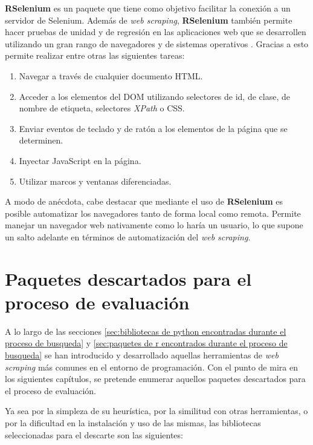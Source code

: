 \textbf{RSelenium} \cite{rselenium-cran} es un paquete que tiene como objetivo facilitar la conexión a un 
servidor de Selenium. Además de \emph{web scraping}, \textbf{RSelenium} también permite hacer pruebas de 
unidad y de regresión en las aplicaciones web que se desarrollen utilizando un gran rango de navegadores 
y de sistemas operativos \cite{tfg-daniel-francisco-lopez}. Gracias a esto permite realizar entre otras 
las siguientes tareas:

\begin{enumerate}
  \item Navegar a través de cualquier documento HTML.
  \item Acceder a los elementos del DOM utilizando selectores de id, de clase, de nombre de etiqueta, 
  selectores \emph{XPath} o CSS.
  \item Enviar eventos de teclado y de ratón a los elementos de la página que se determinen.
  \item Inyectar JavaScript en la página.
  \item Utilizar marcos y ventanas diferenciadas.
\end{enumerate}

A modo de anécdota, cabe destacar que mediante el uso de \textbf{RSelenium} es posible automatizar los
navegadores tanto de forma local como remota. Permite manejar un navegador web nativamente como lo haría
un usuario, lo que supone un salto adelante en términos de automatización del \emph{web scraping}.

\section{Paquetes descartados para el proceso de evaluación}
\label{sec:paquetes descartados para el proceso de evaluacion}

A lo largo de las secciones \ref{sec:bibliotecas de python encontradas durante el proceso de busqueda} y
\ref{sec:paquetes de r encontrados durante el proceso de busqueda} se han introducido y desarrollado
aquellas herramientas de \emph{web scraping} más comunes en el entorno de programación. Con el punto de 
mira en los siguientes capítulos, se pretende enumerar aquellos paquetes descartados para el proceso de 
evaluación.

Ya sea por la simpleza de su heurística, por la similitud con otras herramientas, o por la dificultad en 
la instalación y uso de las mismas, las bibliotecas seleccionadas para el descarte son las siguientes:

